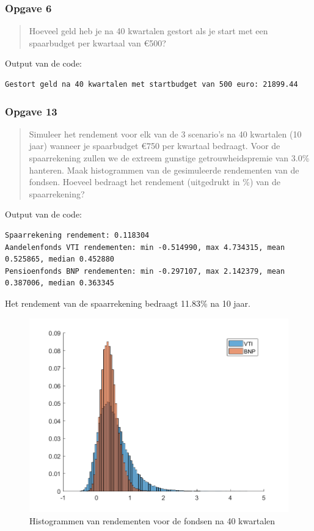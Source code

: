 \documentclass[11pt, a4paper, titlepage, openright]{article}
\begin{document}
	\subsubsection{Opgave 6}
		\begin{quote}
			Hoeveel geld heb je na 40 kwartalen gestort als je start met een spaarbudget per kwartaal van \euro 500?
		\end{quote}

		\noindent Output van de code:
\begin{lstlisting}
Gestort geld na 40 kwartalen met startbudget van 500 euro: 21899.44\end{lstlisting}

	\newpage
	\subsubsection{Opgave 13}
		\begin{quote}
			 Simuleer het rendement voor elk van de 3 scenario's na 40 kwartalen (10 jaar) wanneer je spaarbudget \euro750
			 per kwartaal bedraagt. Voor de spaarrekening zullen we de extreem gunstige getrouwheidspremie van 3.0\%
			 hanteren. Maak histogrammen van de gesimuleerde rendementen van de fondsen.
			 Hoeveel bedraagt het rendement (uitgedrukt in \%) van de spaarrekening?
		\end{quote}

		\noindent Output van de code:
\begin{lstlisting}
Spaarrekening rendement: 0.118304
Aandelenfonds VTI rendementen: min -0.514990, max 4.734315, mean 0.525865, median 0.452880
Pensioenfonds BNP rendementen: min -0.297107, max 2.142379, mean 0.387006, median 0.363345\end{lstlisting}
		Het rendement van de spaarrekening bedraagt 11.83\% na 10 jaar.

		\begin{figure}[H]
		\centering
		\includegraphics[width=1\linewidth]{../ex13}
		\caption{Histogrammen van rendementen voor de fondsen na 40 kwartalen}
		\label{fig:ex13}
		\end{figure}
\end{document}
